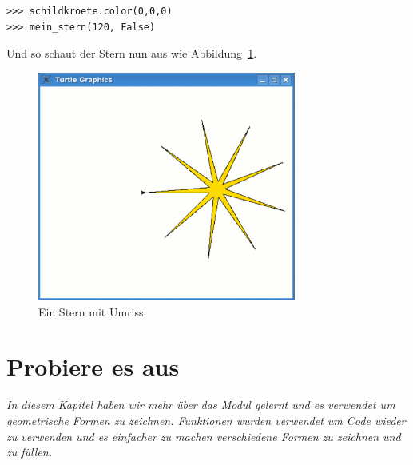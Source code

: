 \begin{Verbatim}[frame=single]
>>> schildkroete.color(0,0,0)
>>> mein_stern(120, False)
\end{Verbatim}

\noindent
Und so schaut der Stern nun aus wie Abbildung~\ref{fig30}.

\begin{figure}
\begin{center}
\includegraphics[width=85mm]{images/figure30}
\end{center}
\caption{Ein Stern mit Umriss.}\label{fig30}
\end{figure}

\section{Probiere es aus}

\emph{In diesem Kapitel haben wir mehr über das  Modul gelernt und es verwendet um geometrische Formen zu zeichnen. Funktionen wurden verwendet um Code wieder zu verwenden und es einfacher zu machen verschiedene Formen zu zeichnen und zu füllen.}

